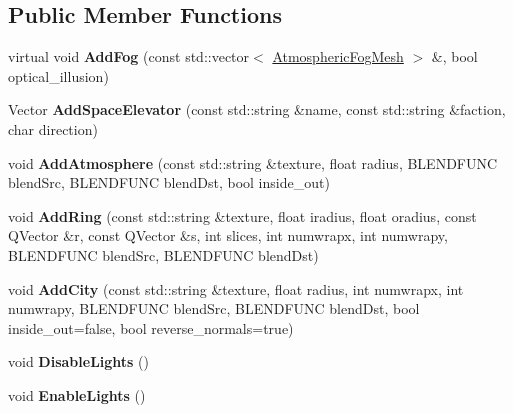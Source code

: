 \subsection*{Public Member Functions}
\begin{DoxyCompactItemize}
\item 
virtual void {\bfseries Add\+Fog} (const std\+::vector$<$ \hyperlink{structAtmosphericFogMesh}{Atmospheric\+Fog\+Mesh} $>$ \&, bool optical\+\_\+illusion)\hypertarget{classGamePlanet_aff000a3f42620aeac8bc55e0c3fed2f6}{}\label{classGamePlanet_aff000a3f42620aeac8bc55e0c3fed2f6}

\item 
Vector {\bfseries Add\+Space\+Elevator} (const std\+::string \&name, const std\+::string \&faction, char direction)\hypertarget{classGamePlanet_a216af9cccef5641854b97c0929b28de5}{}\label{classGamePlanet_a216af9cccef5641854b97c0929b28de5}

\item 
void {\bfseries Add\+Atmosphere} (const std\+::string \&texture, float radius, B\+L\+E\+N\+D\+F\+U\+NC blend\+Src, B\+L\+E\+N\+D\+F\+U\+NC blend\+Dst, bool inside\+\_\+out)\hypertarget{classGamePlanet_a4b0253b10241483ef464c7d19cb7c8fc}{}\label{classGamePlanet_a4b0253b10241483ef464c7d19cb7c8fc}

\item 
void {\bfseries Add\+Ring} (const std\+::string \&texture, float iradius, float oradius, const Q\+Vector \&r, const Q\+Vector \&s, int slices, int numwrapx, int numwrapy, B\+L\+E\+N\+D\+F\+U\+NC blend\+Src, B\+L\+E\+N\+D\+F\+U\+NC blend\+Dst)\hypertarget{classGamePlanet_ac3331c20bbc74cd09849d927a39aa8a5}{}\label{classGamePlanet_ac3331c20bbc74cd09849d927a39aa8a5}

\item 
void {\bfseries Add\+City} (const std\+::string \&texture, float radius, int numwrapx, int numwrapy, B\+L\+E\+N\+D\+F\+U\+NC blend\+Src, B\+L\+E\+N\+D\+F\+U\+NC blend\+Dst, bool inside\+\_\+out=false, bool reverse\+\_\+normals=true)\hypertarget{classGamePlanet_a7988915f23e112a039fca57599430211}{}\label{classGamePlanet_a7988915f23e112a039fca57599430211}

\item 
void {\bfseries Disable\+Lights} ()\hypertarget{classGamePlanet_a0dec74c274d32ffa5fe795e0ce0b4174}{}\label{classGamePlanet_a0dec74c274d32ffa5fe795e0ce0b4174}

\item 
void {\bfseries Enable\+Lights} ()\hypertarget{classGamePlanet_adb913e1407679381abdd54c0bbd938cb}{}\label{classGamePlanet_adb913e1407679381abdd54c0bbd938cb}


\end{DoxyCompactItemize}
